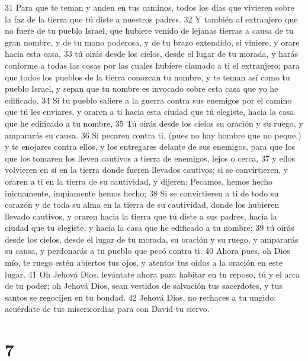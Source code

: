 31 Para que te teman y anden en tus caminos, todos los días que vivieren sobre la faz de la tierra que tú diste a nuestros padres.
32 Y también al extranjero que no fuere de tu pueblo Israel, que hubiere venido de lejanas tierras a causa de tu gran nombre, y de tu mano poderosa, y de tu brazo extendido, si viniere, y orare hacia esta casa,
33  tú oirás desde los cielos, desde el lugar de tu morada, y harás conforme a todas las cosas por las cuales hubiere clamado a ti el extranjero; para que todos los pueblos de la tierra conozcan tu nombre, y te teman así como tu pueblo Israel, y sepan que tu nombre es invocado sobre esta casa que yo he edificado. 
34 Si tu pueblo saliere a la guerra contra sus enemigos por el camino que tú les enviares, y oraren a ti hacia esta ciudad que tú elegiste, hacia la casa que he edificado a tu nombre,
35 Tú oirás desde los cielos su oración y su ruego, y ampararás su causa.
36 Si pecaren contra ti, (pues no hay hombre que no peque,) y te enojares contra ellos, y los entregares delante de sus enemigos, para que los que los tomaren los lleven cautivos a tierra de enemigos, lejos o cerca,
37 y ellos volvieren en sí en la tierra donde fueren llevados cautivos; si se convirtieren, y oraren a ti en la tierra de su cautividad, y dijeren: Pecamos, hemos hecho inicuamente, impíamente hemos hecho;
38 Si se convirtieren a ti de todo su corazón y de toda su alma en la tierra de su cautividad, donde los hubieren llevado cautivos, y oraren hacia la tierra que tú diste a sus padres, hacia la ciudad que tu elegiste, y hacia la casa que he edificado a tu nombre;
39 tú oirás desde los cielos, desde el lugar de tu morada, su oración y su ruego, y ampararás su causa, y perdonarás a tu pueblo que pecó contra ti.
40 Ahora pues, oh Dios mío, te ruego estén abiertos tus ojos, y atentos tus oídos a la oración en este lugar.
41 Oh Jehová Dios, levántate ahora para habitar en tu reposo, tú y el arca de tu poder; oh Jehová Dios, sean vestidos de salvación tus sacerdotes, y tus santos se regocijen en tu bondad.
42 Jehová Dios, no rechaces a tu ungido: acuérdate de tus misericordias para con David tu siervo. 

\chapter{7}

